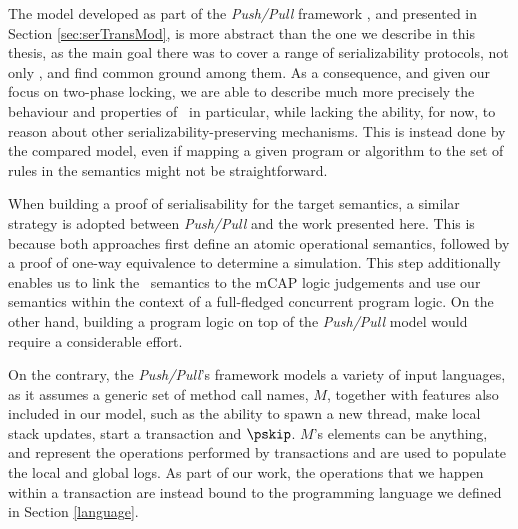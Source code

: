 	The model developed as part of the \textit{Push/Pull} framework \cite{pushPull}, and presented in Section \ref{sec:serTransMod}, is more abstract than the one we describe in this thesis, as the main goal there was to cover a range of serializability protocols, not only \tpl, and find common ground among them. As a consequence, and given our focus on two-phase locking, we are able to describe much more precisely the behaviour and properties of \tpl\ in particular, while lacking the ability, for now, to reason about other serializability-preserving mechanisms. This is instead done by the compared model, even if mapping a given program or algorithm to the set of rules in the semantics might not be straightforward.
	
	When building a proof of serialisability for the target semantics, a similar strategy is adopted between \textit{Push/Pull} and the work presented here. This is because both approaches first define an atomic operational semantics, followed by a proof of one-way equivalence to determine a simulation. This step additionally enables us to link the \tpl\ semantics to the mCAP logic judgements and use our semantics within the context of a full-fledged concurrent program logic. On the other hand, building a program logic on top of the \textit{Push/Pull} model would require a considerable effort.
	
	On the contrary, the \textit{Push/Pull}'s framework models a variety of input languages, as it assumes a generic set of method call names, $M$, together with features also included in our model, such as the ability to spawn a new thread, make local stack updates, start a transaction and $\pskip$. $M$'s elements can be anything, and represent the operations performed by transactions and are used to populate the local and global logs. As part of our work, the operations that we happen within a transaction are instead bound to the programming language we defined in Section \ref{language}.
	
